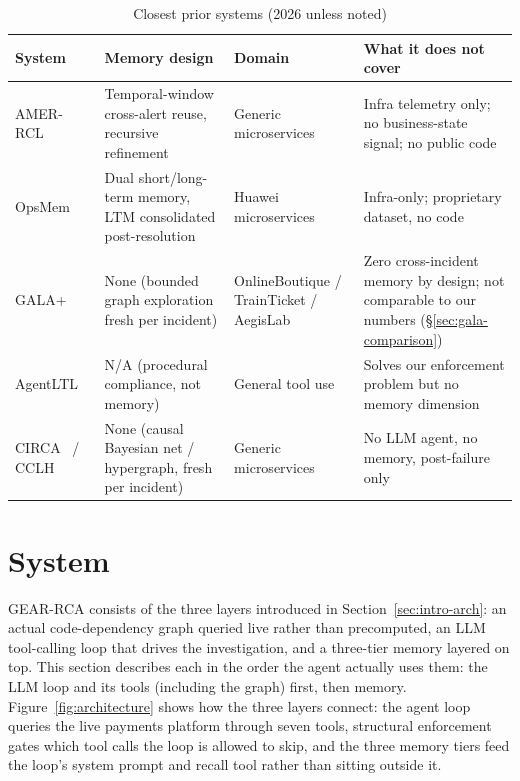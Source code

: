 \documentclass[conference]{IEEEtran}
\begin{document}
\begin{table}[t]
\caption{Closest prior systems (2026 unless noted)}
\label{tab:related}
\centering
\footnotesize
\begin{tabular}{@{}p{2.0cm}p{4.0cm}p{2.7cm}p{6.0cm}@{}}
\toprule
\textbf{System} & \textbf{Memory design} & \textbf{Domain} & \textbf{What it does not cover} \\
\midrule
AMER-RCL~\cite{amerrcl} & Temporal-window cross-alert reuse, recursive refinement &
  Generic microservices & Infra telemetry only; no business-state signal; no public code \\
OpsMem~\cite{opsmem} & Dual short/long-term memory, LTM consolidated post-resolution &
  Huawei microservices & Infra-only; proprietary dataset, no code \\
GALA+~\cite{gala} & None (bounded graph exploration fresh per incident) &
  OnlineBoutique / TrainTicket / AegisLab & Zero cross-incident memory by design; not comparable to our numbers
  (\S\ref{sec:gala-comparison}) \\
AgentLTL~\cite{agentltl} & N/A (procedural compliance, not memory) &
  General tool use & Solves our enforcement problem but no memory dimension \\
CIRCA~\cite{circa} / CCLH~\cite{cclh} & None (causal Bayesian net / hypergraph, fresh per incident) &
  Generic microservices & No LLM agent, no memory, post-failure only \\
\bottomrule
\end{tabular}
\end{table}

\section{System}
\label{sec:system}

GEAR-RCA consists of the three layers introduced in
Section~\ref{sec:intro-arch}: an actual code-dependency graph
queried live rather than precomputed, an LLM tool-calling loop that drives the investigation, and a three-tier
memory layered on top. This section describes each in the order the agent actually uses them: the LLM loop and
its tools (including the graph) first, then memory. Figure~\ref{fig:architecture} shows how the three layers
connect: the agent loop queries the live payments platform through seven tools, structural enforcement gates
which tool calls the loop is allowed to skip, and the three memory tiers feed the loop's system prompt and
recall tool rather than sitting outside it.
\end{document}
